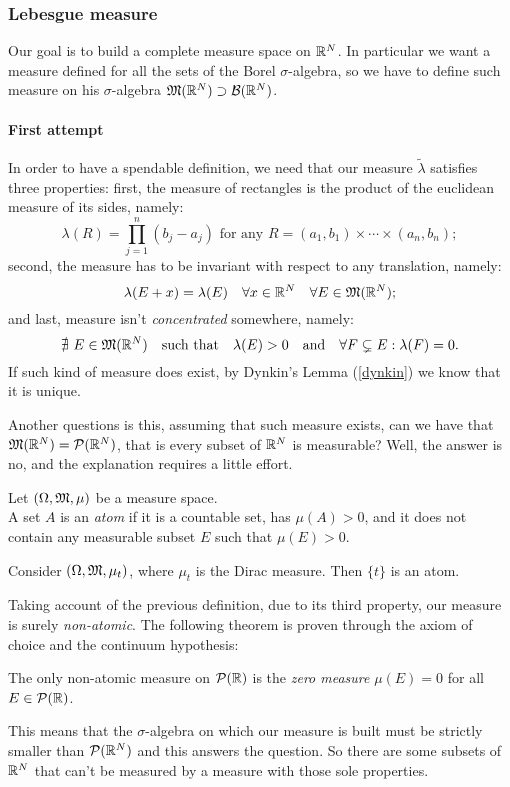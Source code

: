 \subsubsection{Lebesgue measure}
Our goal is to build a complete measure space on $\mathbb R^N$.
In particular we want a measure defined for all the sets of the Borel $\sigma$-algebra, so we have to define such measure on his $\sigma$-algebra $\mathfrak M(\mathbb R^N) \supset \mathcal B(\mathbb R^N)$.

\paragraph{First attempt} In order to have a spendable definition, we need that our measure $\tilde{\lambda}$ satisfies three properties: first, the measure of rectangles is the product of the euclidean measure of its sides, namely:
$$ 
	\lambda(R) 
	= \prod_{j=1}^{n}(b_j-a_j) 
	\text{ for any } 
	R = (a_1, b_1) \times \cdots \times (a_n, b_n)
;
$$
second, the measure has to be invariant with respect to any translation, namely:
$$
	\lambda (E + x) 
	= \lambda(E) 
	\quad \forall x \in \mathbb R^N 
	\quad \forall E \in \mathfrak M(\mathbb R^N)
;
$$
and last, measure isn't \textit{concentrated} somewhere, namely:
$$
	\nexists \ E \in \mathfrak M(\mathbb R^N) 
	\quad \text{such that} \quad \lambda(E) > 0 
	\quad \text{and} \quad \forall F \subsetneq E : \lambda(F) = 0
.
$$ 
If such kind of measure does exist, by Dynkin's Lemma (\vref{dynkin}) we know that it is unique.

Another questions is this, assuming that such measure exists, can we have that $\mathfrak M(\mathbb R^N) = \mathcal P(\mathbb R^N)$, that is every subset of $\mathbb R^N$ is measurable? Well, the answer is no, and the explanation requires a little effort.

\begin{defn}
	Let $(\Omega, \mathfrak M, \mu)$ be a measure space. \\
	A set $A$ is an \emph{atom} if it is a countable set, has $\mu(A) > 0$, and it does not contain any measurable subset $E$ such that $\mu(E) > 0$.
\end{defn}
\begin{exam}
	Consider $(\Omega, \mathfrak M, \mu_t)$, where $\mu_t$ is the Dirac measure. Then $\{t\}$ is an atom.
\end{exam}

Taking account of the previous definition, due to its third property, our measure is surely \emph{non-atomic}. The following theorem is proven through the axiom of choice and the continuum hypothesis:
\begin{theo}[Ulam] \label{theo-ulam}
	The only non-atomic measure on $\mathcal P(\mathbb R)$ is the \emph{zero measure} $\mu(E) = 0$ for all $E \in \mathcal P(\mathbb R)$.
\end{theo}
This means that the $\sigma$-algebra on which our measure is built must be strictly smaller than $\mathcal P(\mathbb R^N)$ and this answers the question. So there are some subsets of $\mathbb R^N$ that can't be measured by a measure with those sole properties.

